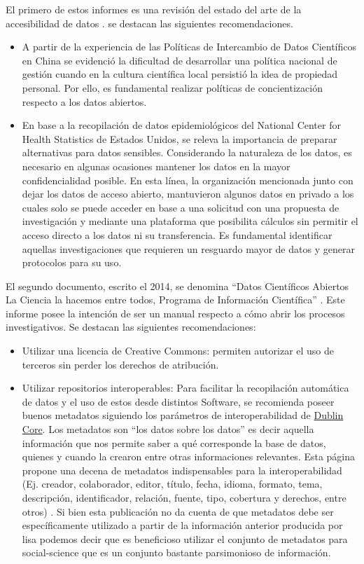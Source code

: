\documentclass[
  14pt,
]{book}
\begin{document}
El primero de estos informes es una revisión del estado del arte de la accesibilidad de datos \citep{munoz_ESTADO_2010}. se destacan las siguientes recomendaciones.

\begin{itemize}
\item
  A partir de la experiencia de las Políticas de Intercambio de Datos Científicos en China se evidenció la dificultad de desarrollar una política nacional de gestión cuando en la cultura científica local persistió la idea de propiedad personal. Por ello, es fundamental realizar políticas de concientización respecto a los datos abiertos.
\item
  En base a la recopilación de datos epidemiológicos del National Center for Health Statistics de Estados Unidos, se releva la importancia de preparar alternativas para datos sensibles. Considerando la naturaleza de los datos, es necesario en algunas ocasiones mantener los datos en la mayor confidencialidad posible. En esta línea, la organización mencionada junto con dejar los datos de acceso abierto, mantuvieron algunos datos en privado a los cuales solo se puede acceder en base a una solicitud con una propuesta de investigación y mediante una plataforma que posibilita cálculos sin permitir el acceso directo a los datos ni su transferencia. Es fundamental identificar aquellas investigaciones que requieren un resguardo mayor de datos y generar protocolos para su uso.
\end{itemize}

El segundo documento, escrito el 2014, se denomina ``Datos Científicos Abiertos La Ciencia la hacemos entre todos, Programa de Información Científica'' \citep{hernandez_Manual_2014}. Este informe posee la intención de ser un manual respecto a cómo abrir los procesos investigativos. Se destacan las siguientes recomendaciones:

\begin{itemize}
\item
  Utilizar una licencia de Creative Commons: permiten autorizar el uso de terceros sin perder los derechos de atribución.
\item
  Utilizar repositorios interoperables: Para facilitar la recopilación automática de datos y el uso de estos desde distintos Software, se recomienda poseer buenos metadatos siguiendo los parámetros de interoperabilidad de \href{http://dublincore.org/}{Dublin Core}. Los metadatos son ``los datos sobre los datos'' es decir aquella información que nos permite saber a qué corresponde la base de datos, quienes y cuando la crearon entre otras informaciones relevantes. Esta página propone una decena de metadatos indispensables para la interoperabilidad (Ej. creador, colaborador, editor, título, fecha, idioma, formato, tema, descripción, identificador, relación, fuente, tipo, cobertura y derechos, entre otros) \citep{dublin-core_Dublin_2020}. Si bien esta publicación no da cuenta de que metadatos debe ser específicamente utilizado a partir de la información anterior producida por lisa podemos decir que es beneficioso utilizar el conjunto de metadatos para social-science que es un conjunto bastante parsimonioso de información.
\end{itemize}
\end{document}
